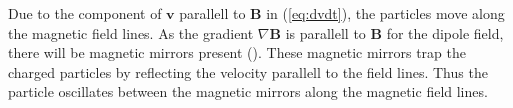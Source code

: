 Due to the component of $\bm{v}$ parallell to $\bm{B}$ in (\ref{eq:dvdt}), the particles move along the magnetic field lines.
As the gradient $\nabla \bm{B}$ is parallell to $\bm{B}$ for the dipole field, there will be magnetic mirrors present (\cite{chen_2015}).
These magnetic mirrors trap the charged particles by reflecting the velocity parallell to the field lines.
Thus the particle oscillates between the magnetic mirrors along the magnetic field lines.

